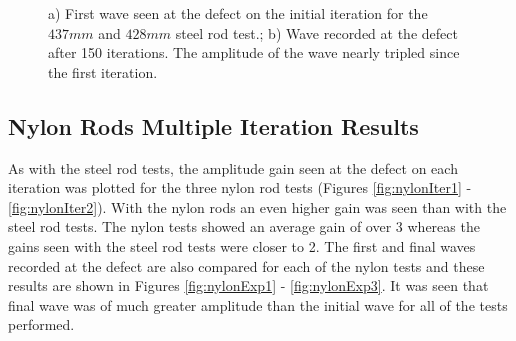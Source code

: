   \begin{figure}
 \begin{subfigmatrix}{2}
 \end{subfigmatrix}
 
    \caption
    { \label{fig:steelExp3}
    a) First wave seen at the defect on the initial iteration for the $437 mm$ and $428 mm$ steel rod test.; b) Wave recorded at the defect after 150 iterations. The amplitude of the wave nearly tripled since the first iteration.
  }
 \end{figure}
 
 \subsection{Nylon Rods Multiple Iteration Results}
 As with the steel rod tests, the amplitude gain seen at the defect on each iteration was plotted for the three nylon rod tests (Figures \ref{fig:nylonIter1} - \ref{fig:nylonIter2}). With the nylon rods an even higher gain was seen than with the steel rod tests. The nylon tests showed an average gain of over 3 whereas the gains seen with the steel rod tests were closer to 2. The first and final waves recorded at the defect are also compared for each of the nylon tests and these results are shown in Figures \ref{fig:nylonExp1} - \ref{fig:nylonExp3}. It was seen that final wave was of much greater amplitude than the initial wave for all of the tests performed.
 
